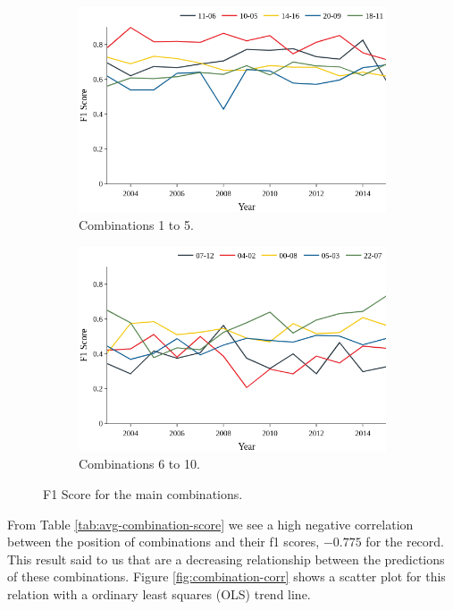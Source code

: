 \begin{figure}[h!]
	\begin{subfigure}{0.49\textwidth}
		\includegraphics[width=\linewidth]{01.Chapters/05.Results/f1-combination-1-5}
		\caption{Combinations 1 to 5.}
		\label{fig:top1-5}
	\end{subfigure}%
	\hfill
	\begin{subfigure}{0.49\textwidth}
		\includegraphics[width=\linewidth]{01.Chapters/05.Results/f1-combination-6-10}
		\caption{Combinations 6 to 10.}
		\label{fig:top6-10}
	\end{subfigure}%
	\caption{F1 Score for the main combinations.}
	\label{fig:f1-combination}
\end{figure}


From Table \ref{tab:avg-combination-score} we see a high negative correlation between the position of combinations and their f1 scores, $-0.775$ for the record. This result said to us that are a decreasing relationship between the predictions of these combinations. Figure \ref{fig:combination-corr} shows a scatter plot for this relation with a ordinary least squares (OLS) trend line.

